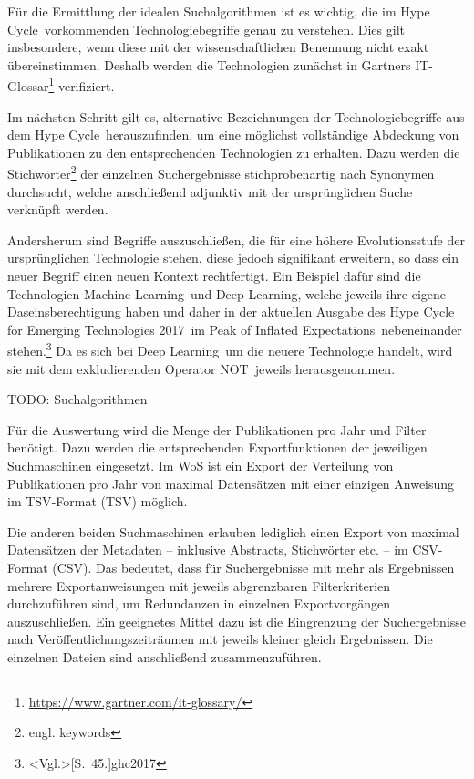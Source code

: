 Für die Ermittlung der idealen Suchalgorithmen ist es wichtig, die im \glqq Hype Cycle\grqq~vorkommenden Technologiebegriffe genau zu verstehen. Dies gilt insbesondere, wenn diese mit der wissenschaftlichen Benennung nicht exakt übereinstimmen. Deshalb werden die Technologien zunächst in Gartners IT-Glossar\footnote{\url{https://www.gartner.com/it-glossary/}} verifiziert.

Im nächsten Schritt gilt es, alternative Bezeichnungen der Technologiebegriffe aus dem \glqq Hype Cycle\grqq~herauszufinden, um eine möglichst vollständige Abdeckung von Publikationen zu den entsprechenden Technologien zu erhalten. Dazu werden die Stichwörter\footnote{engl. keywords} der einzelnen Suchergebnisse stichprobenartig nach Synonymen durchsucht, welche anschließend adjunktiv mit der ursprünglichen Suche verknüpft werden.

Andersherum sind Begriffe auszuschließen, die für eine höhere Evolutionsstufe der ursprünglichen Technologie stehen, diese jedoch signifikant erweitern, so dass ein neuer Begriff einen neuen Kontext rechtfertigt. Ein Beispiel dafür sind die Technologien \glqq Machine Learning\grqq~und \glqq Deep Learning\grqq, welche jeweils ihre eigene Daseinsberechtigung haben und daher in der aktuellen Ausgabe des \glqq Hype Cycle for Emerging Technologies 2017\grqq~im \glqq Peak of Inflated Expectations\grqq~nebeneinander stehen.\footnote{\citeNP<Vgl.>[S.~45.]{ghc2017}} Da es sich bei \glqq Deep Learning\grqq~um die neuere Technologie handelt, wird sie mit dem exkludierenden Operator \glqq NOT\grqq~jeweils herausgenommen.

TODO: Suchalgorithmen

Für die Auswertung wird die Menge der Publikationen pro Jahr und Filter benötigt. Dazu werden die entsprechenden Exportfunktionen der jeweiligen Suchmaschinen eingesetzt. Im \ac{WoS} ist ein Export der Verteilung von Publikationen pro Jahr von maximal  Datensätzen mit einer einzigen Anweisung im \acs{TSV}-Format (\acl{TSV}) möglich.

Die anderen beiden Suchmaschinen erlauben lediglich einen Export von maximal  Datensätzen der Metadaten -- inklusive Abstracts, Stichwörter etc. -- im \acs{CSV}-Format (\acl{CSV}). Das bedeutet, dass für Suchergebnisse mit mehr als  Ergebnissen mehrere Exportanweisungen mit jeweils abgrenzbaren Filterkriterien durchzuführen sind, um Redundanzen in einzelnen Exportvorgängen auszuschließen. Ein geeignetes Mittel dazu ist die Eingrenzung der Suchergebnisse nach Veröffentlichungs\-zeiträumen mit jeweils kleiner gleich  Ergebnissen. Die einzelnen Dateien sind anschließend zusammenzuführen.

